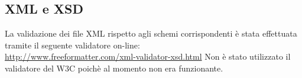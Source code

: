 \subsection{XML e XSD}
La validazione dei file XML rispetto agli schemi corrispondenti \`e stata effettuata tramite il seguente validatore on-line:
\\
\href{http://www.freeformatter.com/xml-validator-xsd.html}{http://www.freeformatter.com/xml-validator-xsd.html}
Non è stato utilizzato il validatore del W3C poich\`e al momento non era funzionante.
